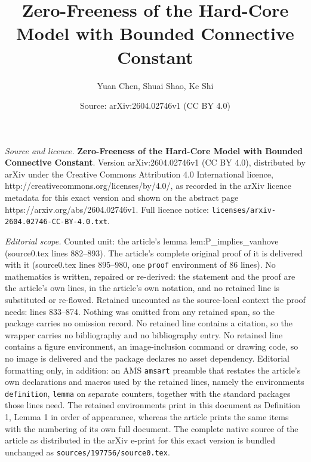\documentclass[10pt,a4paper]{amsart}
\title{\textbf{Zero-Freeness of the Hard-Core Model with Bounded Connective Constant}}
\author{Yuan Chen, Shuai Shao, Ke Shi}
\date{Source: arXiv:2604.02746v1 (CC BY 4.0)}
\begin{document}
\maketitle

\noindent\emph{Source and licence.} \textbf{Zero-Freeness of the Hard-Core Model with Bounded Connective Constant}. Version arXiv:2604.02746v1 (CC BY 4.0), distributed by arXiv under the Creative Commons Attribution 4.0 International licence, http://creativecommons.org/licenses/by/4.0/, as recorded in the arXiv licence metadata for this exact version and shown on the abstract page https://arxiv.org/abs/2604.02746v1. Full licence notice: \texttt{licenses/arxiv-2604.02746-CC-BY-4.0.txt}.\par\smallskip

\noindent\textit{Editorial scope.} Counted unit: the article's lemma lem:P\_implies\_vanhove (source0.tex lines 882--893). The article's complete original proof of it is delivered with it (source0.tex lines 895--980, one \texttt{proof} environment of 86 lines). No mathematics is written, repaired or re-derived: the statement and the proof are the article's own lines, in the article's own notation, and no retained line is substituted or re-flowed.  Retained uncounted as the source-local context the proof needs: lines 833--874.  Nothing was omitted from any retained span, so the package carries no omission record.  No retained line contains a citation, so the wrapper carries no bibliography and no bibliography entry.  No retained line contains a figure environment, an image-inclusion command or drawing code, so no image is delivered and the package declares no asset dependency.  Editorial formatting only, in addition: an AMS \texttt{amsart} preamble that restates the article's own declarations and macros used by the retained lines, namely the environments \texttt{definition}, \texttt{lemma} on separate counters, together with the standard packages those lines need.  The retained environments print in this document as Definition 1, Lemma 1 in order of appearance, whereas the article prints the same items with the numbering of its own full document.  The complete native source of the article as distributed in the arXiv e-print for this exact version is bundled unchanged as \texttt{sources/197756/source0.tex}.
\end{document}
